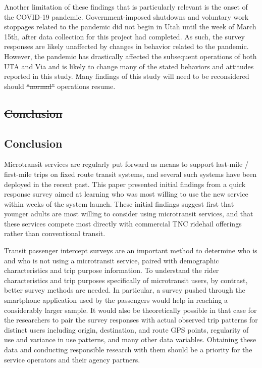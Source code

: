 \documentclass[smartcities,article,submit,moreauthors,pdftex]{mdpi} %
\providecommand{\DIFadd}[1]{{\protect\color{blue}\uwave{#1}}} %
\providecommand{\DIFdel}[1]{{\protect\color{red}\sout{#1}}}                      %
\providecommand{\DIFaddbegin}{} %
\providecommand{\DIFaddend}{} %
\providecommand{\DIFdelbegin}{} %
\providecommand{\DIFdelend}{} %
\begin{document}
Another limitation of these findings that is particularly relevant is the onset
of the COVID-19 pandemic. Government-imposed shutdowns and voluntary work
stoppages related to the pandemic did not begin in Utah until the week of March
15th, after data collection for this project had completed. As such, the survey
responses are likely unaffected by changes in behavior related to the pandemic.
However, the pandemic has drastically affected the subsequent operations of both
UTA and Via and is likely to change many of the stated behaviors and attitudes
reported in this study. Many findings of this study will need to be reconsidered
should \DIFdelbegin \DIFdel{“normal” }\DIFdelend \DIFaddbegin \DIFadd{``normal'' }\DIFaddend operations resume.

\DIFdelbegin \subsection{\DIFdel{Conclusion}}
\addtocounter{subsection}{-1}%
\DIFdelend \DIFaddbegin \hypertarget{conclusion}{%
\subsection{Conclusion}\label{conclusion}}
\DIFaddend 

Microtransit services are regularly put forward as means to support last-mile /
first-mile trips on fixed route transit systems, and several such systems have
been deployed in the recent past. This paper presented initial findings from a
quick response survey aimed at learning who was most willing to use the new
service within weeks of the system launch. These initial findings suggest first
that younger adults are most willing to consider using microtransit services,
and that these services compete most directly with commercial TNC ridehail
offerings rather than conventional transit.

Transit passenger intercept surveys are an important method to determine who is
and who is not using a microtransit service, paired with demographic
characteristics and trip purpose information. To understand the rider
characteristics and trip purposes specifically of microtransit users, by
contrast, better survey methods are needed. In particular, a survey pushed
through the smartphone application used by the passengers would help in reaching
a considerably larger sample. It would also be theoretically possible in that
case for the researchers to pair the survey responses with actual observed trip
patterns for distinct users including origin, destination, and route GPS points,
regularity of use and variance in use patterns, and many other data variables.
Obtaining these data and conducting responsible research with them should be a
priority for the service operators and their agency partners.
\end{document}
